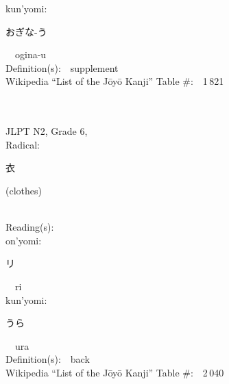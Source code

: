 \begin{multicols}{2}
{\hspace*{1em}}kun'yomi:\ \ \\
{\hspace*{2em}}{\begin{CJK}{UTF8}{min} おぎな-う \end{CJK}}\ \ ogina-u\ \ \\
Definition(s):\ \ supplement \\
Wikipedia ``List of the J\=oy\=o Kanji'' Table \#:\ \ 1\,821 \\
\ \ \\
{\fontsize{34pt}{40pt}  }\ \ \\  %
{JLPT N2, Grade 6, \\Radical:\ \ {\begin{CJK}{UTF8}{min} 衣 \end{CJK}} (clothes) } \\
Reading(s):\ \ \\
{\hspace*{1em}}on'yomi:\ \ \\
{\hspace*{2em}}{\begin{CJK}{UTF8}{min} リ \end{CJK}}\ \ ri\ \ \\
{\hspace*{1em}}kun'yomi:\ \ \\
{\hspace*{2em}}{\begin{CJK}{UTF8}{min} うら \end{CJK}}\ \ ura\ \ \\
Definition(s):\ \ back \\
Wikipedia ``List of the J\=oy\=o Kanji'' Table \#:\ \ 2\,040 \\
\ \ \\
\end{multicols}



